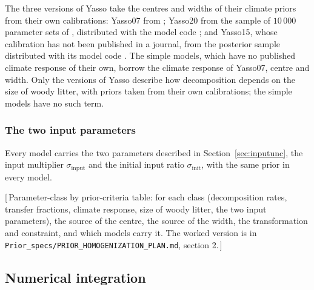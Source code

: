 \documentclass[11pt]{article}
\newcommand{\gap}[1]{\textcolor{red!70!black}{\small[\,#1\,]}}
\newcommand{\sinput}{\sigma_{\mathrm{input}}}
\newcommand{\sinit}{\sigma_{\mathrm{init}}}
\begin{document}
The three versions of Yasso take the centres and widths of their climate priors from their own
calibrations: Yasso07 from \citet{Tuomi2009,Tuomi2011woody}; Yasso20 from the sample of
$10\,000$ parameter sets of \citet{Viskari2022}, distributed with the model code
\citep{Yasso20code}; and Yasso15, whose calibration has not been published in a journal, from
the posterior sample distributed with its model code \citep{Yasso15code}. The simple models, which
have no published climate response of their own, borrow the climate response of Yasso07, centre
and width. Only the versions of Yasso describe how decomposition depends on the size of woody
litter, with priors taken from their own calibrations; the simple models have no such term.

\subsubsection{The two input parameters}

Every model carries the two parameters described in Section~\ref{sec:inputunc}, the input
multiplier $\sinput$ and the initial input ratio $\sinit$, with the same prior in every model.

\begin{table}[htbp]\centering\small
\caption{\textbf{How the prior of each class of parameter was set.}\label{tab:priors}}
\gap{Parameter-class by prior-criteria table: for each class (decomposition rates, transfer
fractions, climate response, size of woody litter, the two input parameters), the source of
the centre, the source of the width, the transformation and constraint, and which models carry
it. The worked version is in \texttt{Prior\_specs/PRIOR\_HOMOGENIZATION\_PLAN.md}, section 2.}
\end{table}

\subsection{Numerical integration}\label{sec:integration}
\end{document}
